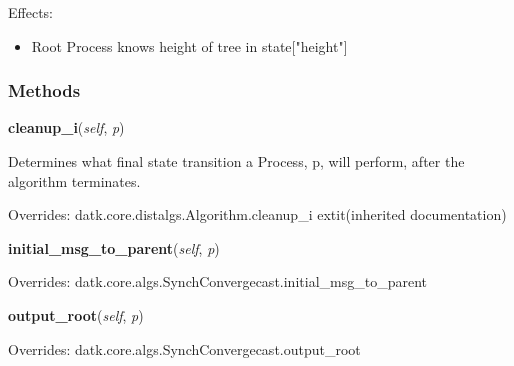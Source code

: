 Effects:

\begin{itemize}
\setlength{\parskip}{0.6ex}
  \item Root Process knows height of tree in state["height"]

\end{itemize}



  \subsubsection{Methods}

    \vspace{0.5ex}

\hspace{.8\funcindent}\begin{boxedminipage}{\funcwidth}

    \raggedright \textbf{cleanup\_i}(\textit{self}, \textit{p})

\setlength{\parskip}{2ex}
    Determines what final state transition a Process, p, will perform, 
    after the algorithm terminates.

\setlength{\parskip}{1ex}
      Overrides: datk.core.distalgs.Algorithm.cleanup\_i 	extit{(inherited documentation)}

    \end{boxedminipage}

    \vspace{0.5ex}

\hspace{.8\funcindent}\begin{boxedminipage}{\funcwidth}

    \raggedright \textbf{initial\_msg\_to\_parent}(\textit{self}, \textit{p})

\setlength{\parskip}{2ex}
\setlength{\parskip}{1ex}
      Overrides: datk.core.algs.SynchConvergecast.initial\_msg\_to\_parent

    \end{boxedminipage}

    \vspace{0.5ex}

\hspace{.8\funcindent}\begin{boxedminipage}{\funcwidth}

    \raggedright \textbf{output\_root}(\textit{self}, \textit{p})

\setlength{\parskip}{2ex}
\setlength{\parskip}{1ex}
      Overrides: datk.core.algs.SynchConvergecast.output\_root

    \end{boxedminipage}

